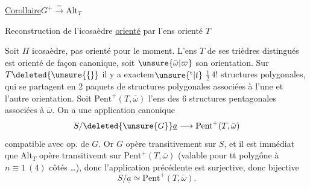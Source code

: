 \uline{Corollaire}\qquad $G^+\xrightarrow{\sim}\mathrm{Alt}_T$

Reconstruction de l'icosaèdre \uline{orienté} par l'ens orienté $T$

Soit $\Pi$ icosaèdre,  pas orienté pour le moment. L'ens $T$ de ses trièdres distingués est orienté de façon canonique, soit $\unsure{\bar\omega|\varpi}$ son orientation. Sur $T\deleted{\unsure{\{}}$ il y a exactem$\unsure{^{\mathrm t}|t}$ $\frac12\,4!$  structures polygonales, qui se partagent en $2$ paquets de  structures polygonales associées à l'une et l'autre orientation. Soit $\mathrm{Pent}^+(T,\bar\omega)$ l'ens des $6$ structures pentagonales associées à $\bar\omega$. On a une application canonique
\[
S/\deleted{\unsure{G}}\underline a\longrightarrow\mathrm{Pent}^+(T,\bar\omega)
\]
compatible avec op. de $G$. Or $G$ opère transitivement sur $S$, et il est immédiat que $\mathrm{Alt}_T$ opère transitivemt sur $\mathrm{Pent}^+(T,\bar\omega)$ (valable pour tt polygône à $n\equiv1\ (4)$ côtés \ldots), donc l'application précédente est surjective, donc bijective
\[
S/\underline a\simeq\mathrm{Pent}^+(T,\bar\omega).
\]
